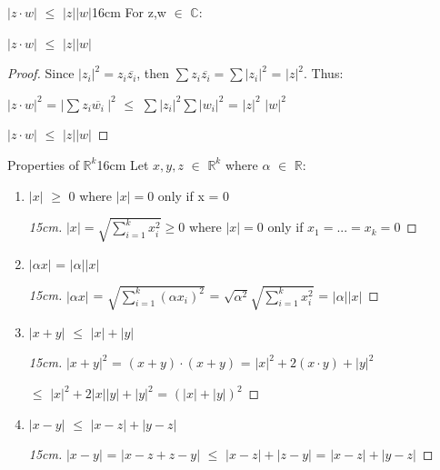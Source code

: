 	\vspace{0.5cm}
	


	\begin{corollary}{$|z \cdot w|$ $\leq$ $|z| |w|$}{16cm}
		For z,w $\in$ $\mathbb{C}$:

		\hspace{0.5cm}
		$|z \cdot w|$ $\leq$ $|z| |w|$
	\end{corollary}

	\begin{proof}
		Since $|z_i|^2 = z_i\overline{z_i}$, then
		$\sum z_i\overline{z_i} = \sum |z_i|^2$ = $|z|^2$. Thus:

		\hspace{1cm}
		$|z \cdot w|^2$ = $|\sum z_i\overline{w_i} \ |^2$
		$\leq$ $\sum |z_i|^2 \sum |w_i|^2$ = $|z|^2$ $|w|^2$

		\hspace{0.5cm}
		$|z \cdot w|$ $\leq$ $|z| |w|$
	\end{proof}

	\newpage



	\begin{wtheorem}{Properties of $\mathbb{R}^k$}{16cm}
		Let $x,y,z$ $\in$ $\mathbb{R}^k$ where $\alpha$ $\in$ $\mathbb{R}$:
	\end{wtheorem}
	
	\begin{enumerate}[label=(\alph*), leftmargin=2cm, itemsep=0.1cm]
		\item $|x|$ $\geq$ 0 where $|x| = 0$ only if x = 0

			\begin{proof}[15cm]
				$|x| = \sqrt{\sum_{i=1}^{k} x_i^2} \geq 0$ where $|x| = 0$
				only if $x_1 = ... = x_k = 0$
			\end{proof}

		\item $|\alpha x|$ = $|\alpha| |x|$
		
			\begin{proof}[15cm]
				$|\alpha x|$ = $\sqrt{\sum_{i=1}^k (\alpha x_i)^2}$
				= $\sqrt{\alpha^2} \sqrt{\sum_{i=1}^k x_i^2}$ = $|\alpha| |x|$
			\end{proof}
	
		\item $|x+y|$ $\leq$ $|x| + |y|$
		
			\begin{proof}[15cm]
				$|x+y|^2$ = $(x+y) \cdot (x+y)$ = $|x|^2 + 2(x \cdot y) + |y|^2$

				$\leq$ $|x|^2 + 2|x||y| + |y|^2$ = $(|x|+|y|)^2$
			\end{proof}

		\item $|x-y|$ $\leq$ $|x-z| + |y-z|$
		
			\begin{proof}[15cm]
				$|x-y|$ = $|x-z + z-y|$ $\leq$ $|x-z| + |z-y|$ = $|x-z| + |y-z|$
			\end{proof}
	\end{enumerate}




	